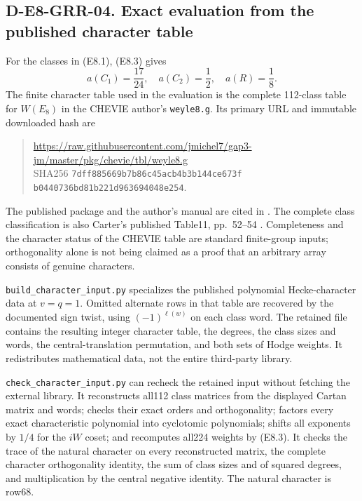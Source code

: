 \subsection*{D-E8-GRR-04. Exact evaluation from the published character table}

For the classes in (E8.1), (E8.3) gives
\[
                     a(C_1)=\frac{17}{24},\quad
                     a(C_2)=\frac12,\quad a(R)=\frac18.       \tag{E8.17}
\]
The finite character table used in the evaluation is the complete
112-class table for $W(E_8)$ in the CHEVIE author's
\texttt{weyle8.g}.  Its primary URL and immutable downloaded hash are
\begin{quote}\small
\url{https://raw.githubusercontent.com/jmichel7/gap3-jm/master/pkg/chevie/tbl/weyle8.g}\\
SHA256 \texttt{7dff885669b7b86c45acb4b3b144ce673f}\allowbreak
\texttt{b0440736bd81b221d963694048e254}.
\end{quote}
The published package and the author's manual are cited in
\cite{E8GRR:Michel,E8GRR:CHEVIE}.  The complete class classification
is also Carter's published Table11, pp.~52--54
\cite{E8GRR:Carter}.  Completeness and the character status of the
CHEVIE table are standard finite-group inputs; orthogonality alone
is not being claimed as a proof that an arbitrary array consists
of genuine characters.

\texttt{build\_character\_input.py} specializes the published
polynomial Hecke-character data at $v=q=1$.  Omitted alternate rows
in that table are recovered by the documented sign twist, using
$(-1)^{\ell(w)}$ on each class word.  The retained file contains
the resulting integer character table, the degrees, the class
sizes and words, the central-translation permutation, and both
sets of Hodge weights.  It redistributes mathematical data, not
the entire third-party library.

\texttt{check\_character\_input.py} can recheck the retained
input without fetching the external library.  It reconstructs
all112 class matrices from the displayed Cartan matrix and words;
checks their exact orders and orthogonality; factors every exact
characteristic polynomial into cyclotomic polynomials; shifts
all exponents by $1/4$ for the $iW$ coset; and recomputes all224
weights by (E8.3).  It checks the trace of the natural character
on every reconstructed matrix, the complete character
orthogonality identity, the sum of class sizes and of squared
degrees, and multiplication by the central negative identity.
The natural character is row68.

